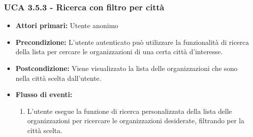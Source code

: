 \subsubsection{UCA 3.5.3 - Ricerca con filtro per città}%
\begin{itemize}
	\item \textbf{Attori primari:} Utente anonimo
	\item \textbf{Precondizione:} L'utente autenticato può utilizzare la funzionalità di ricerca della lista per cercare le organizzazioni di una certa città d'interesse.
	\item \textbf{Postcondizione:} Viene visualizzato la lista delle organizzazioni che sono nella città scelta dall'utente.
	\item \textbf{Flusso di eventi:}
	\begin{enumerate}
		\item L'utente esegue la funzione di ricerca personalizzata della lista delle organizzazioni per ricercare le organizzazioni desiderate, filtrando per la città scelta.
	\end{enumerate}
\end{itemize}